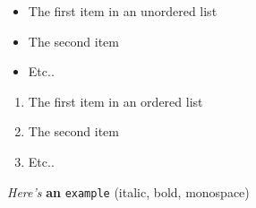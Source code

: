 \documentclass[a4paper]{article}
\begin{document}
\begin{itemize}
\item The first item in an unordered list

\item The second item

\item Etc..

\end{itemize}
\bigbreak
\begin{enumerate}
\item The first item in an ordered list

\item The second item

\item Etc..

\end{enumerate}
\bigbreak
\emph{Here's} \textbf{an} \texttt{example} (italic, bold, monospace)
\bigbreak
\end{document}
